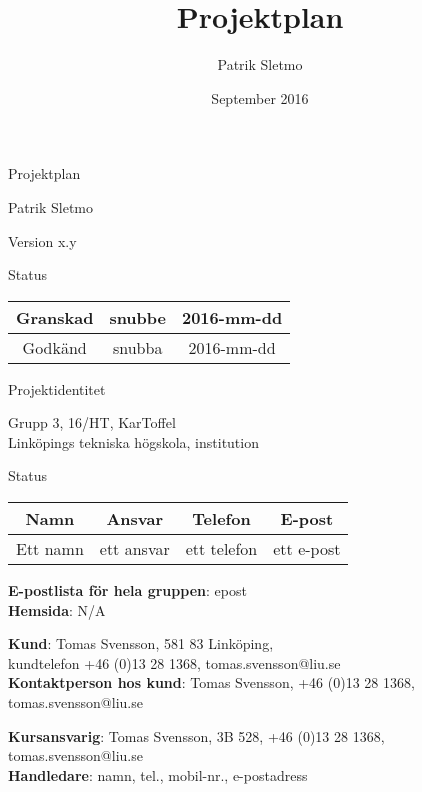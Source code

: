 \documentclass{article}
\title{Projektplan}
\author{Patrik Sletmo}
\date{September 2016}
\begin{document}

\thispagestyle{empty}

{
\sffamily
\centering
\large


{\huge 
Projektplan
}

{\large
Patrik Sletmo
}

{\large
Version x.y
}

\vspace{3.5cm}

Status
\begin{center}
\begin{tabular}{ | c | c | c | } 
\hline
Granskad & snubbe & 2016-mm-dd \\
\hline
Godkänd & snubba & 2016-mm-dd\\
\hline
\end{tabular}
\end{center}
}

\clearpage

{
\sffamily
\centering
\large


{\huge 
Projektidentitet
}

{\large
Grupp 3, 16/HT, KarToffel \\ Linköpings tekniska högskola, institution 
}

\vspace{3.5cm}

Status
\begin{center}
\begin{tabular}{ | c | c | c | c |} 
\hline
Namn & Ansvar & Telefon & E-post \\  
\hline
Ett namn & ett ansvar & ett telefon & ett e-post \\
\hline
\end{tabular}
\end{center}
}

\begin{center}
\textbf{E-postlista för hela gruppen}: epost \\
\textbf{Hemsida}: N/A
\end{center}

\begin{center}
\textbf{Kund}: Tomas Svensson, 581 83 Linköping, \\
kundtelefon +46 (0)13 28 1368, tomas.svensson@liu.se \\
\textbf{Kontaktperson hos kund}: Tomas Svensson, +46 (0)13 28 1368, tomas.svensson@liu.se
\end{center}

\begin{center}
\textbf{Kursansvarig}: Tomas Svensson, 3B 528, +46 (0)13 28 1368, tomas.svensson@liu.se \\
\textbf{Handledare}: namn, tel., mobil-nr., e-postadress 
\end{center}
\clearpage
\end{document}

